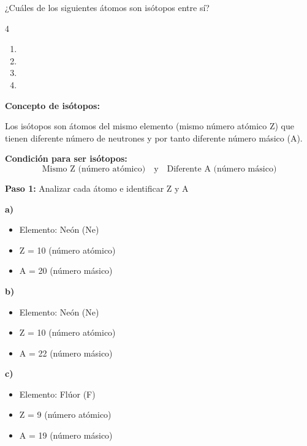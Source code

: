 \begin{exercise}
    ¿Cuáles de los siguientes átomos son isótopos entre sí?
    \begin{multicols}{4}
        \begin{enumerate}[label=\letraminuscula]
        \item {}
        \item {}
        \item {}
        \item {}
        \end{enumerate}
    \end{multicols}
    \begin{solu}
        \textbf{Concepto de isótopos:}

        Los isótopos son átomos del mismo elemento (mismo número atómico Z) que tienen diferente número de neutrones y por tanto diferente número másico (A).

        \textbf{Condición para ser isótopos:}
        \[
            \text{Mismo Z (número atómico)} \quad \text{y} \quad \text{Diferente A (número másico)}
        \]

        \textbf{Paso 1:} Analizar cada átomo e identificar Z y A

        \textbf{a) }
        \begin{itemize}
            \item Elemento: Neón (Ne)
            \item Z = 10 (número atómico)
            \item A = 20 (número másico)
        \end{itemize}

        \textbf{b) }
        \begin{itemize}
            \item Elemento: Neón (Ne)
            \item Z = 10 (número atómico)
            \item A = 22 (número másico)
        \end{itemize}

        \textbf{c) }
        \begin{itemize}
            \item Elemento: Flúor (F)
            \item Z = 9 (número atómico)
            \item A = 19 (número másico)
        \end{itemize}


\end{solu}
\end{exercise}

